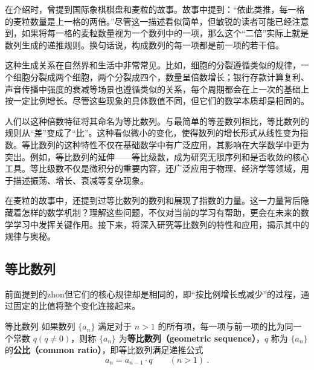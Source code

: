 
\begin{issues}
\issueDraft
\end{issues}


在介绍时，曾提到国际象棋棋盘和麦粒的故事。故事中提到：“依此类推，每一格的麦粒数量是上一格的两倍。”尽管这一描述看似简单，但敏锐的读者可能已经注意到，如果将每一格的麦粒数量视为一个数列中的一项，那么这个“二倍”实际上就是数列生成的递推规则。换句话说，构成数列的每一项都是前一项的若干倍。

这种生成关系在自然界和生活中非常常见。比如，细胞的分裂遵循类似的规律，一个细胞分裂成两个细胞，两个分裂成四个，数量呈倍数增长；银行存款计算复利、声音传播中强度的衰减等场景也遵循类似的关系，每个周期都会在上一次的基础上按一定比例增长。尽管这些现象的具体数值不同，但它们的数学本质却是相同的。

人们以这种倍数特征将其命名为等比数列。与最简单的等差数列相比，等比数列的规则从“差”变成了“比”。这种看似微小的变化，使得数列的增长形式从线性变为指数。等比数列的这种特性不仅在基础数学中有广泛应用，其影响在大学数学中更为突出。例如，等比数列的延伸——等比级数，成为研究无限序列和是否收敛的核心工具。等比级数不仅是微积分的重要内容，还广泛应用于物理、经济学等领域，用于描述振荡、增长、衰减等复杂现象。

在麦粒的故事中，还提到过等比数列的数列和展现了指数的力量。这一力量背后隐藏着怎样的数学机制？理解这些问题，不仅对当前的学习有帮助，更会在未来的数学学习中发挥关键作用。接下来，将深入研究等比数列的特性和应用，揭示其中的规律与奥秘。

\subsection{等比数列}

前面提到的zhon但它们的核心规律却是相同的，即“按比例增长或减少”的过程，通过固定的比值将整个变化连接起来。

\begin{definition}{等比数列}
如果数列 $\{a_n\}$ 满足对于 $n > 1$ 的所有项，每一项与前一项的比为同一个常数 $q(q\neq0)$，则称 $\{a_n\}$ 为\textbf{等比数列（geometric sequence）}，$q$ 称为 $\{a_n\}$ 的\textbf{公比（common ratio）}，即等比数列满足递推公式
\begin{equation}
a_{n}=a_{n-1}\cdot q\qquad(n>1)~.
\end{equation}
\end{definition}

